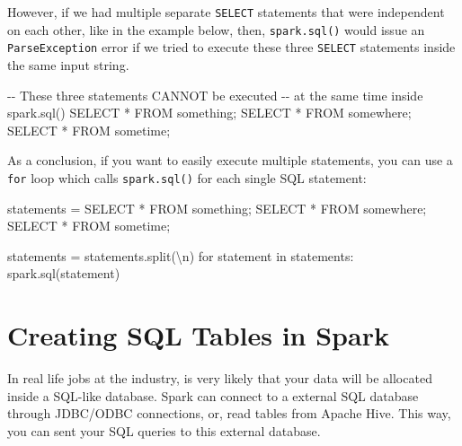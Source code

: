 \documentclass[
  11pt,
  letterpaper,
  DIV=11,
  numbers=noendperiod]{scrreprt}
\newenvironment{Shaded}{\begin{snugshade}}{\end{snugshade}}
\newcommand{\CharTok}[1]{\textcolor[rgb]{0.13,0.47,0.30}{#1}}
\newcommand{\CommentTok}[1]{\textcolor[rgb]{0.37,0.37,0.37}{#1}}
\newcommand{\ControlFlowTok}[1]{\textcolor[rgb]{0.00,0.23,0.31}{#1}}
\newcommand{\KeywordTok}[1]{\textcolor[rgb]{0.00,0.23,0.31}{#1}}
\newcommand{\NormalTok}[1]{\textcolor[rgb]{0.00,0.23,0.31}{#1}}
\newcommand{\OperatorTok}[1]{\textcolor[rgb]{0.37,0.37,0.37}{#1}}
\newcommand{\StringTok}[1]{\textcolor[rgb]{0.13,0.47,0.30}{#1}}
\begin{document}
However, if we had multiple separate \texttt{SELECT} statements that
were independent on each other, like in the example below, then,
\texttt{spark.sql()} would issue an \texttt{ParseException} error if we
tried to execute these three \texttt{SELECT} statements inside the same
input string.

\begin{Shaded}
\begin{Highlighting}[]
\CommentTok{{-}{-} These three statements CANNOT be executed}
\CommentTok{{-}{-} at the same time inside spark.sql()}
\KeywordTok{SELECT} \OperatorTok{*} \KeywordTok{FROM}\NormalTok{ something;}
\KeywordTok{SELECT} \OperatorTok{*} \KeywordTok{FROM}\NormalTok{ somewhere;}
\KeywordTok{SELECT} \OperatorTok{*} \KeywordTok{FROM}\NormalTok{ sometime;}
\end{Highlighting}
\end{Shaded}

As a conclusion, if you want to easily execute multiple statements, you
can use a \texttt{for} loop which calls \texttt{spark.sql()} for each
single SQL statement:

\begin{Shaded}
\begin{Highlighting}[]
\NormalTok{statements }\OperatorTok{=} \StringTok{\textquotesingle{}\textquotesingle{}\textquotesingle{}SELECT * FROM something;}
\StringTok{SELECT * FROM somewhere;}
\StringTok{SELECT * FROM sometime;\textquotesingle{}\textquotesingle{}\textquotesingle{}}

\NormalTok{statements }\OperatorTok{=}\NormalTok{ statements.split(}\StringTok{\textquotesingle{}}\CharTok{\textbackslash{}n}\StringTok{\textquotesingle{}}\NormalTok{)}
\ControlFlowTok{for}\NormalTok{ statement }\KeywordTok{in}\NormalTok{ statements:}
\NormalTok{  spark.sql(statement)}
\end{Highlighting}
\end{Shaded}

\section{Creating SQL Tables in
Spark}\label{creating-sql-tables-in-spark}

In real life jobs at the industry, is very likely that your data will be
allocated inside a SQL-like database. Spark can connect to a external
SQL database through JDBC/ODBC connections, or, read tables from Apache
Hive. This way, you can sent your SQL queries to this external database.
\end{document}
